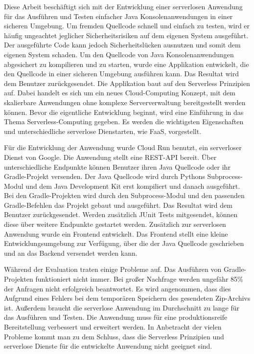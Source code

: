 \begin{center} 
    \huge {}
\end{center}

Diese Arbeit beschäftigt sich mit der Entwicklung einer
serverlosen Anwendung für das Ausführen und Testen einfacher Java
Konsolenanwendungen in einer sicheren Umgebung.
Um fremden Quellcode schnell und einfach zu testen,
wird er häufig ungeachtet jeglicher Sicherheitsrisiken
auf dem eigenen System ausgeführt. Der ausgeführte Code kann
jedoch Sicherheitslücken ausnutzen und somit dem eigenen
System schaden. Um den Quellcode von Java Konsolenanwendungen
abgesichert zu kompilieren und zu starten, wurde eine Applikation entwickelt,
die den Quellcode in einer sicheren Umgebung ausführen kann. Das
Resultat wird dem Benutzer zurückgesendet. Die Applikation
baut auf den Serverless Prinzipien auf. Dabei handelt es
sich um ein neues Cloud-Computing Konzept, mit dem
skalierbare Anwendungen ohne komplexe Serververwaltung
bereitgestellt werden können.
Bevor die eigentliche Entwicklung beginnt, wird eine Einführung
in das Thema Serverless-Computing gegeben. Es werden die
wichtigsten Eigenschaften und unterschiedliche serverlose
Dienstarten, wie FaaS, vorgestellt.

Für die Entwicklung der Anwendung wurde Cloud Run
benutzt, ein serverloser Dienst von Google. Die Anwendung
stellt eine REST-API bereit. Über unterschiedliche Endpunkte können
Benutzer ihren Java Quellcode oder ihr Gradle-Projekt versenden.
Der Java Quellcode wird durch Pythons Subprocess-Modul und dem
Java Development Kit erst kompiliert und danach ausgeführt.
Bei den Gradle-Projekten wird durch den Subprocess-Modul und den
passenden Gradle-Befehlen das Projekt gebaut und ausgeführt.
Das Resultat wird dem Benutzer zurückgesendet. Werden
zusätzlich JUnit Tests mitgesendet, können diese über
weitere Endpunkte gestartet werden. Zusätzlich zur
serverlosen Anwendung wurde ein Frontend entwickelt.
Das Frontend stellt eine kleine Entwicklungsumgebung zur Verfügung,
über die der Java Quellcode geschrieben und an das Backend versendet
werden kann.

Während der Evaluation traten einige Probleme auf.
Das Ausführen von Gradle-Projekten funktioniert nicht immer.
Bei großer Nachfrage werden ungefähr 85\% der Anfragen nicht erfolgreich
beantwortet. Es wird angenommen, dass dies Aufgrund eines Fehlers
bei dem temporären Speichern des gesendeten Zip-Archivs ist.
Außerdem braucht die serverlose Anwendung im Durchschnitt zu lange
für das Ausführen und Testen. Die Anwendung muss für eine
produktionsreife Bereitstellung verbessert und erweitert werden.
In Anbetracht der vielen Probleme kommt man zu dem Schluss,
dass die Serverless Prinzipien und serverlose Dienste
für die entwickelte Anwendung nicht geeignet sind.

